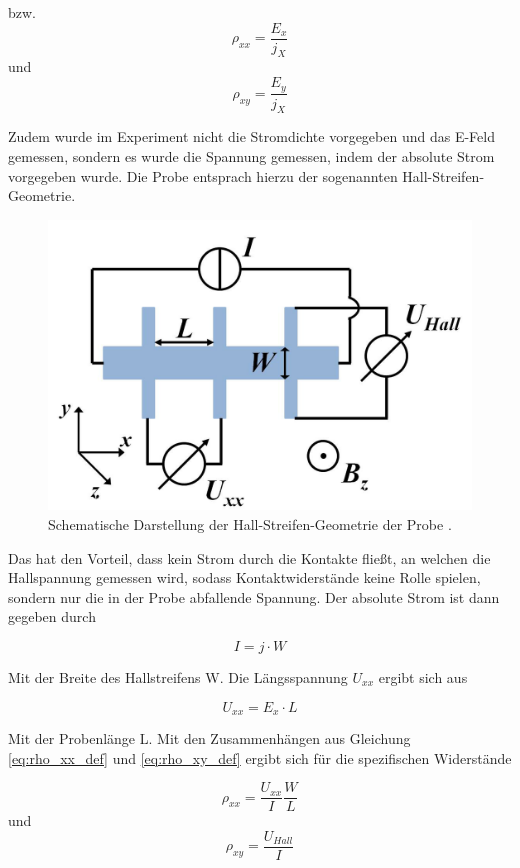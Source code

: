 bzw. 
\begin{equation}
\rho_{xx}=\frac{E_x}{j_X}
\label{eq:rho_xx_def}
\end{equation}
und 
\begin{equation}
\rho_{xy}=\frac{E_y}{j_X}
\label{eq:rho_xy_def}
\end{equation}

Zudem wurde im Experiment nicht die Stromdichte vorgegeben und das E-Feld gemessen, sondern es wurde die Spannung gemessen, indem der absolute Strom vorgegeben wurde. Die Probe entsprach hierzu der sogenannten Hall-Streifen-Geometrie. 

\begin{figure}
\centering
\includegraphics[width=0.4\linewidth]{images/Anleitungsheft/Hallstreifen_Geometrie_Anleitungsheft.png}
\caption[Hallstreifengeometrie]{Schematische Darstellung der Hall-Streifen-Geometrie der Probe \cite{anleitung}.}
\label{fig:Hallstreifen_Geometrie_Anleitungsheft}
\end{figure}

Das hat den Vorteil, dass kein Strom durch die Kontakte fließt, an welchen die Hallspannung gemessen wird, sodass Kontaktwiderstände keine Rolle spielen, sondern nur die in der Probe abfallende Spannung. Der absolute Strom ist dann gegeben durch

\begin{equation}
I=j \cdot W
\label{eq:absoluter_Strom}
\end{equation}

Mit der Breite des Hallstreifens W. Die Längsspannung $U_{xx}$ ergibt sich aus

\begin{equation}
U_{xx}=E_x \cdot L
\label{eq:laengsspannung}
\end{equation}

Mit der Probenlänge L. Mit den Zusammenhängen aus Gleichung \ref{eq:rho_xx_def} und \ref{eq:rho_xy_def} ergibt sich für die spezifischen Widerstände

\begin{equation}
\rho_{xx}=\frac{U_{xx}}{I}\frac{W}{L}
\label{eq:rho_xx}
\end{equation}
und
\begin{equation}
\rho_{xy}=\frac{U_{Hall}}{I}
\label{eq:rho_xy}
\end{equation}

